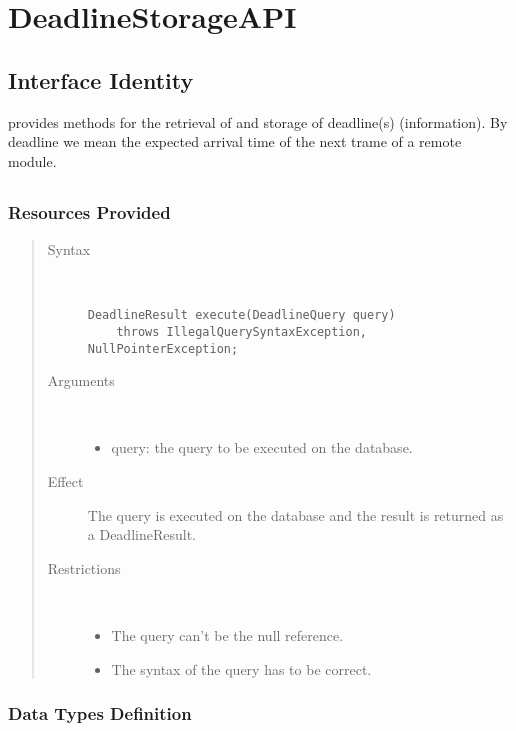 \section{DeadlineStorageAPI}
\label{api:deadline-storage-api}

\subsection{Interface Identity}

\npar {} provides methods for the retrieval of and
storage of deadline(s) (information). By deadline we mean the expected arrival
time of the next trame of a remote module.

\subsection{}

\subsubsection{Resources Provided}

\begin{quote}
	\begin{description}
		\item[Syntax] \
		\begin{verbatim}
DeadlineResult execute(DeadlineQuery query)
    throws IllegalQuerySyntaxException, NullPointerException;
		\end{verbatim}
		\item[Arguments] \
		\begin{itemize}
		  \item query: the query to be executed on the database. 
		\end{itemize}
		\item[Effect] The query is executed on the database and the result is returned
		as a DeadlineResult. 
		\item[Restrictions] \
		\begin{itemize}
		  \item The query can't be the null reference.
		  \item The syntax of the query has to be correct.
		\end{itemize}
	\end{description} 
\end{quote}

\subsubsection{Data Types Definition}

